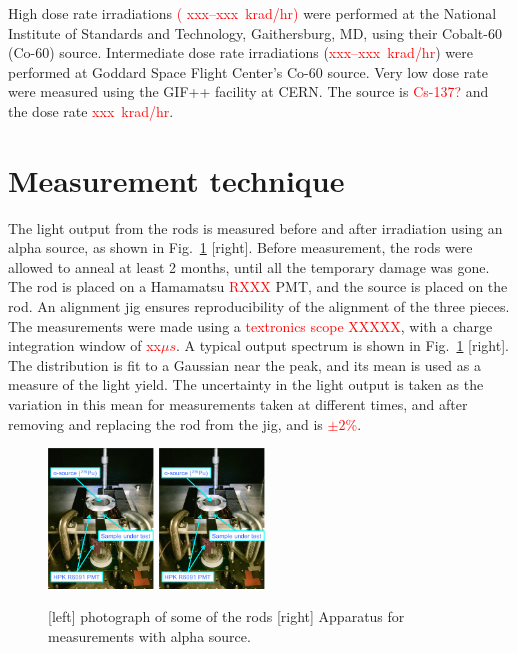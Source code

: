\documentclass[review]{elsarticle}
\begin{document}
High dose rate irradiations \textcolor{red}{( xxx--xxx~krad/hr)}
were performed at the National Institute of Standards and Technology, Gaithersburg, MD, using their Cobalt-60 (Co-60) source.  Intermediate dose rate irradiations (\textcolor{red}{xxx--xxx~krad/hr}) were performed at Goddard Space Flight Center's Co-60 source.  Very low dose rate were measured using the GIF++ facility\cite{gif} at CERN.  The source is \textcolor{red}{Cs-137?} and the dose rate \textcolor{red}{xxx~krad/hr}.

\section{Measurement technique}
The light output from the rods is measured before and after
irradiation using an alpha source, as shown in Fig.~\ref{fig:hd} [right].
Before measurement, the rods were allowed to anneal
at least 2 months,  until all the temporary damage was gone.
The rod is placed on a Hamamatsu \textcolor{red}{RXXX} PMT, and the
source is placed on the rod.  An alignment jig ensures reproducibility
of the alignment of the three pieces.  The measurements were made using
a \textcolor{red}{textronics scope XXXXX}, with a charge integration
window of \textcolor{red}{xx$\mu s$}.
A typical output spectrum is shown in Fig.~\ref{fig:hd} [right].
The distribution is fit to a Gaussian near the peak, and its mean is used as a measure of the light yield.  The uncertainty in the light output is taken as the variation in this mean for measurements taken at different times, and after removing and replacing the rod from the jig, and is
\textcolor{red}{$\pm 2$\%}.

\begin{figure}[hbtp]
\centering
\includegraphics[width=0.25\textwidth]{Setup_AlphaSource.pdf}
\includegraphics[width=0.25\textwidth]{Setup_AlphaSource.pdf}
\caption{
[left] photograph of some of the rods
[right] Apparatus for measurements with alpha source.
}
  \label{fig:hd}
\end{figure}
\end{document}
